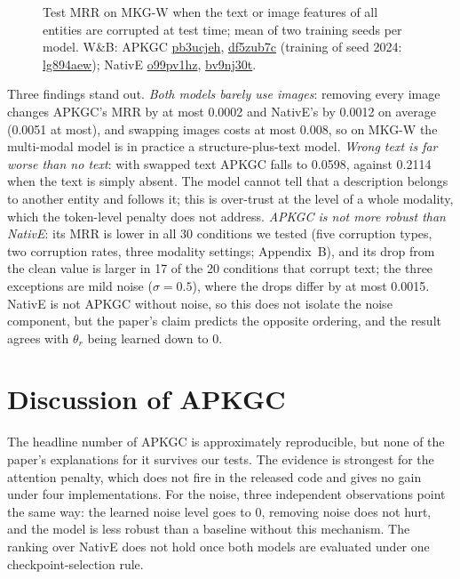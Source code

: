 \documentclass[conference,a4paper]{IEEEtran}
\newcommand{\wb}[2]{\href{https://wandb.ai/nhantrnh-graphml/#1}{{\normalfont\ttfamily #2}}}
\begin{document}
\begin{figure}[!t]
\centering
\resizebox{\columnwidth}{!}{}
\caption{Test MRR on MKG-W when the text or image features of all entities are corrupted at test time; mean of two training seeds per model. W\&B: APKGC \wb{apkgc-repro/runs/pb3ucjeh}{pb3ucjeh}, \wb{apkgc-repro/runs/df5zub7c}{df5zub7c} (training of seed 2024: \wb{apkgc-repro/runs/lg894aew}{lg894aew}); NativE \wb{apkgc-repro/runs/o99pv1hz}{o99pv1hz}, \wb{apkgc-repro/runs/bv9nj30t}{bv9nj30t}.}
\label{fig:robust}
\end{figure}

Three findings stand out. \emph{Both models barely use images}: removing every image
changes APKGC's MRR by at most 0.0002 and NativE's by 0.0012 on average (0.0051 at most),
and swapping images costs at most 0.008, so on MKG-W the multi-modal model is in practice a
structure-plus-text model. \emph{Wrong text is far worse than no text}: with swapped text
APKGC falls to 0.0598, against 0.2114 when the text is simply absent. The model cannot tell
that a description belongs to another entity and follows it; this is over-trust at the
level of a whole modality, which the token-level penalty does not address. \emph{APKGC is
not more robust than NativE}: its MRR is lower in all 30 conditions we tested (five
corruption types, two corruption rates, three modality settings; Appendix~B), and its drop from the
clean value is larger in 17 of the 20 conditions that corrupt text; the three exceptions
are mild noise ($\sigma=0.5$), where the drops differ by at most 0.0015. NativE is not
APKGC without noise, so this does not isolate the noise component, but the paper's claim
predicts the opposite ordering, and the result agrees with $\theta_r$ being learned down
to 0.

\section{Discussion of APKGC}
The headline number of APKGC is approximately reproducible, but none of the paper's
explanations for it survives our tests. The evidence is strongest for the attention
penalty, which does not fire in the released code and gives no gain under four
implementations. For the noise, three independent observations point the same way: the
learned noise level goes to 0, removing noise does not hurt, and the model is less robust
than a baseline without this mechanism. The ranking over NativE does not hold once both
models are evaluated under one checkpoint-selection rule.
\end{document}
